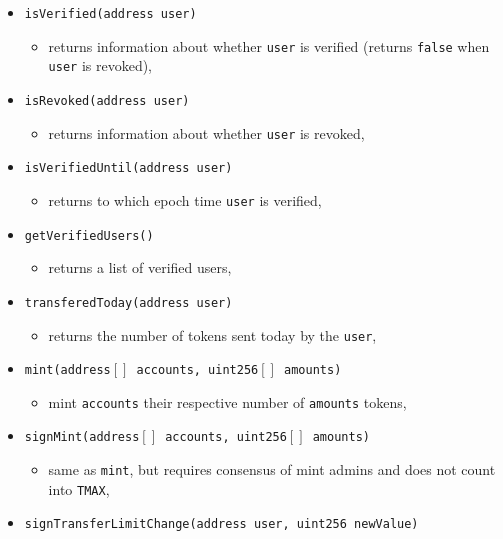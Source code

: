 \documentclass[12pt]{article}
\begin{document}
\begin{itemize}
    \item \texttt{isVerified(address user)}
        \begin{itemize}
            \item[] returns information about whether \texttt{user} is verified (returns \texttt{false} when \texttt{user} is revoked),
        \end{itemize}
    \item \texttt{isRevoked(address user)}
        \begin{itemize}
            \item[] returns information about whether \texttt{user} is revoked,
        \end{itemize}
    \item \texttt{isVerifiedUntil(address user)}
        \begin{itemize}
            \item[] returns to which epoch time \texttt{user} is verified,
        \end{itemize}
    \item \texttt{getVerifiedUsers()}
        \begin{itemize}
            \item[] returns a list of verified users,
        \end{itemize}
    \item \texttt{transferedToday(address user)}
        \begin{itemize}
            \item[] returns the number of tokens sent today by the \texttt{user},
        \end{itemize}
    \item \texttt{mint(address$[]$ accounts, uint256$[]$ amounts)}
        \begin{itemize}
            \item[] mint \texttt{accounts} their respective number of \texttt{amounts} tokens,
        \end{itemize}
    \item \texttt{signMint(address$[]$ accounts, uint256$[]$ amounts)}
        \begin{itemize}
            \item[] same as \texttt{mint}, but requires consensus of mint admins and does not count into \texttt{TMAX},
        \end{itemize}
    \item \texttt{signTransferLimitChange(address user, uint256 newValue)}

\end{itemize}
\end{document}
